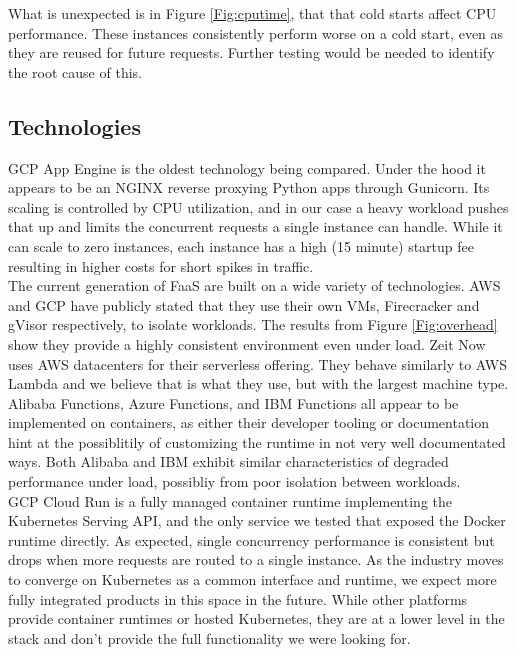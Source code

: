 \documentclass[11pt]{article}
\begin{document}
What is unexpected is in Figure \ref{Fig:cputime},
that that cold starts affect CPU performance.
These instances consistently perform worse on a cold start,
even as they are reused for future requests.
Further testing would be needed to identify the root cause of this.

\subsection{Technologies}
GCP App Engine is the oldest technology being compared.
Under the hood it appears to be an NGINX reverse proxying Python apps through Gunicorn.
Its scaling is controlled by CPU utilization,
and in our case a heavy workload pushes that up
and limits the concurrent requests a single instance can handle.
While it can scale to zero instances,
each instance has a high (15 minute) startup fee \cite{gcp}
resulting in higher costs for short spikes in traffic. \\

The current generation of FaaS are built on a wide variety of technologies.
AWS and GCP have publicly stated that they use their own VMs,
Firecracker and gVisor respectively, to isolate workloads.
The results from Figure \ref{Fig:overhead}
show they provide a highly consistent environment even under load.
Zeit Now uses AWS datacenters \cite{zn}
for their serverless offering.
They behave similarly to AWS Lambda
and we believe that is what they use, but with the largest machine type.
Alibaba Functions, Azure Functions, and IBM Functions
all appear to be implemented on containers,
as either their developer tooling or documentation
hint at the possiblitily of customizing the runtime in not very well documentated ways.
Both Alibaba and IBM exhibit similar characteristics of degraded performance under load,
possibliy from poor isolation between workloads. \\

GCP Cloud Run is a fully managed container runtime implementing the Kubernetes Serving API,
and the only service we tested that exposed the Docker runtime directly.
As expected, single concurrency performance is consistent
but drops when more requests are routed to a single instance.
As the industry moves to converge on Kubernetes as a common interface and runtime,
we expect more fully integrated products in this space in the future.
While other platforms provide container runtimes or hosted Kubernetes,
they are at a lower level in the stack and don't provide the full functionality we were looking for.
\end{document}
